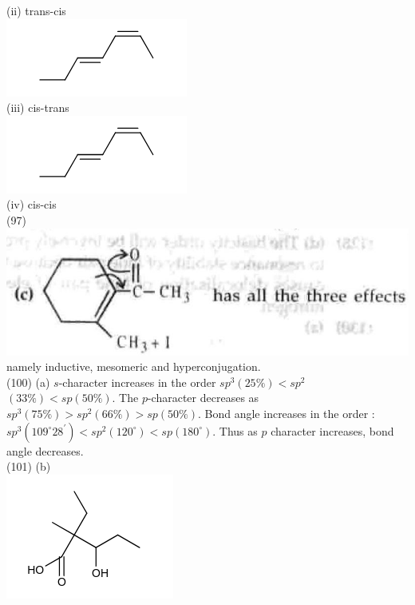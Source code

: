 \documentclass[10pt]{article}
\begin{document}
(ii) trans-cis\\
\includegraphics{smile-70bb216bf8dde241e5c25509f9493a67439cc4bd}\\
(iii) cis-trans\\
\includegraphics{smile-b351142d578f65e02d0943808f1add56eca89bea}\\
(iv) cis-cis\\
(97)\\
\includegraphics[max width=\textwidth, center]{2025_01_28_8470952b98110cec3aabg-161(2)}\\
namely inductive, mesomeric and hyperconjugation.\\
(100) (a) $s$-character increases in the order $s p^{3}(25 \%)<s p^{2}$ $(33 \%)<s p(50 \%)$. The $p$-character decreases as $s p^{3}(75 \%)>s p^{2}(66 \%)>s p(50 \%)$. Bond angle increases in the order : $s p^{3}\left(109^{\circ} 28^{\prime}\right)<s p^{2}\left(120^{\circ}\right)<s p\left(180^{\circ}\right)$. Thus as $p$ character increases, bond angle decreases.\\
(101) (b)\\
\includegraphics{smile-13a025a2ec724e88709bdec8884c9a19ef7f1fc6}
\end{document}
